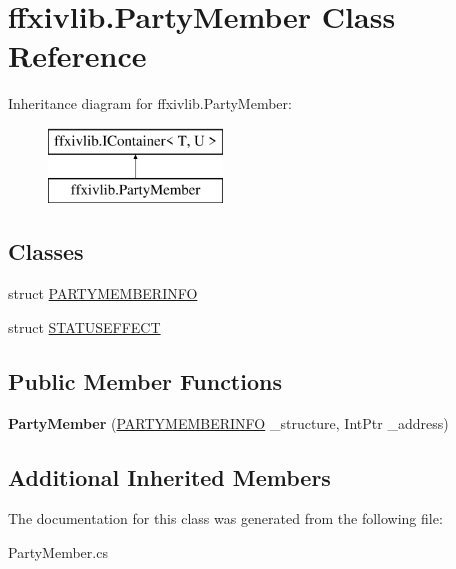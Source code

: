 \hypertarget{classffxivlib_1_1_party_member}{\section{ffxivlib.\-Party\-Member Class Reference}
\label{classffxivlib_1_1_party_member}
}
Inheritance diagram for ffxivlib.\-Party\-Member\-:\begin{figure}[H]
\begin{center}
\leavevmode
\includegraphics[height=2.000000cm]{classffxivlib_1_1_party_member}
\end{center}
\end{figure}
\subsection*{Classes}
\begin{DoxyCompactItemize}
\item 
struct \hyperlink{structffxivlib_1_1_party_member_1_1_p_a_r_t_y_m_e_m_b_e_r_i_n_f_o}{P\-A\-R\-T\-Y\-M\-E\-M\-B\-E\-R\-I\-N\-F\-O}
\item 
struct \hyperlink{structffxivlib_1_1_party_member_1_1_s_t_a_t_u_s_e_f_f_e_c_t}{S\-T\-A\-T\-U\-S\-E\-F\-F\-E\-C\-T}
\end{DoxyCompactItemize}
\subsection*{Public Member Functions}
\begin{DoxyCompactItemize}
\item 
\hypertarget{classffxivlib_1_1_party_member_adc4a8b102bf341ca1dce3a2a7f92fa28}{{\bfseries Party\-Member} (\hyperlink{structffxivlib_1_1_party_member_1_1_p_a_r_t_y_m_e_m_b_e_r_i_n_f_o}{P\-A\-R\-T\-Y\-M\-E\-M\-B\-E\-R\-I\-N\-F\-O} \-\_\-structure, Int\-Ptr \-\_\-address)}\label{classffxivlib_1_1_party_member_adc4a8b102bf341ca1dce3a2a7f92fa28}

\end{DoxyCompactItemize}
\subsection*{Additional Inherited Members}


The documentation for this class was generated from the following file\-:\begin{DoxyCompactItemize}
\item 
Party\-Member.\-cs\end{DoxyCompactItemize}
